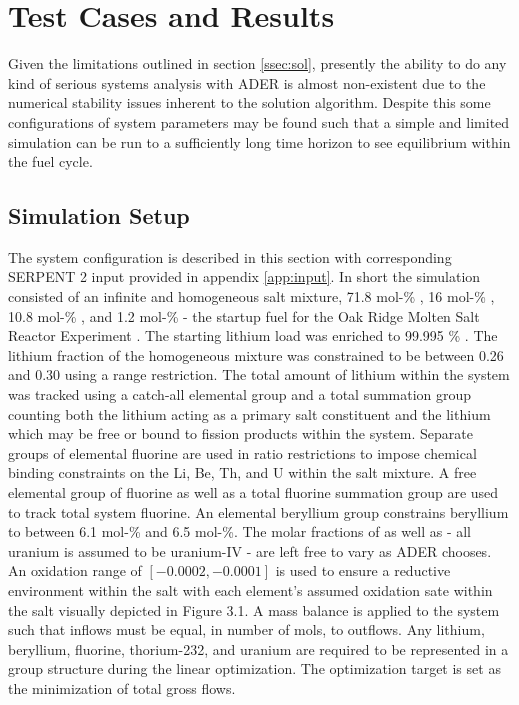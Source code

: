 \chapter{Test Cases and Results}
\label{ch:results}

Given the limitations outlined in section \ref{ssec:sol}, presently the ability
to do any kind of serious systems analysis with ADER is almost non-existent due
to the numerical stability issues inherent to the solution algorithm. Despite
this some configurations of system parameters may be found such that a simple
and limited simulation can be run to a sufficiently long time horizon to see
equilibrium within the fuel cycle.

\section{Simulation Setup}\label{ssec:setup}
The system configuration is described in this section with corresponding 
SERPENT 2
input provided in appendix \ref{app:input}. In short the simulation consisted
of an infinite and homogeneous salt mixture, 71.8 mol-\% , 16 mol-\%
, 10.8 mol-\% , and 1.2 mol-\%  - the startup
fuel for the Oak Ridge Molten Salt Reactor Experiment \cite{ORNL}. The starting
lithium load was enriched to 99.995 \% . The lithium
fraction of the homogeneous mixture was constrained to be between 0.26 and 0.30
using a range restriction. The total amount of lithium within the system was
tracked using a catch-all elemental group and a total summation group counting
both the lithium acting as a primary salt constituent and the lithium which may
be free or bound to fission products within the system. Separate groups of
elemental fluorine are used in ratio restrictions to impose chemical binding 
constraints on the Li, Be, Th, and U within the salt mixture. A free elemental
group of fluorine as well as a total fluorine summation group are used to track
total system fluorine. An elemental beryllium group constrains beryllium to
between 6.1 mol-\% and 6.5 mol-\%. The molar fractions of  as well
as  - all uranium is assumed to be uranium-IV - are left free to vary
as ADER chooses. An oxidation range of $[-0.0002, -0.0001]$ is used to ensure
a reductive environment within the salt with each element's assumed oxidation
sate within the salt visually depicted in Figure 3.1. 
A mass balance is applied to the
system such that inflows must be equal, in number of mols, to outflows. Any
lithium, beryllium, fluorine, thorium-232, and uranium are required to be
represented in a group structure during the linear optimization. The
optimization target is set as the minimization of total gross flows.

